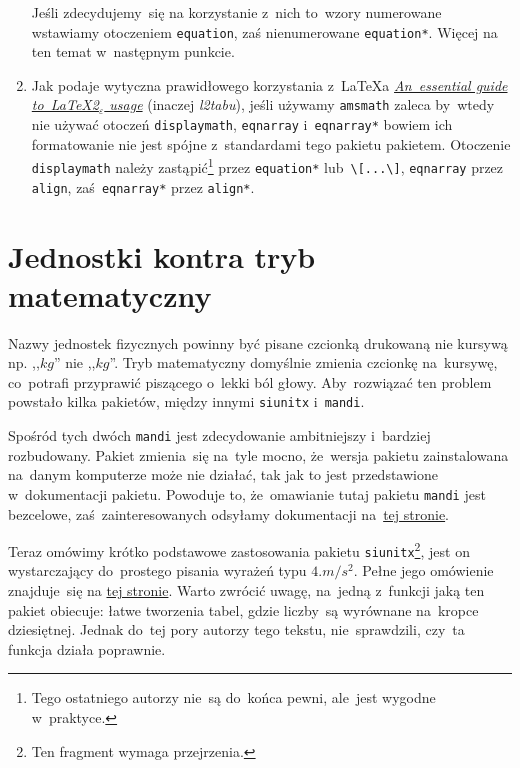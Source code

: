 \documentclass[a4paper,11pt]{article}
\newcommand{\tbs}{\textbackslash}  %
\begin{document}
\begin{enumerate}
  Jeśli zdecydujemy~się na korzystanie z~nich to~wzory numerowane
  wstawiamy otoczeniem \texttt{equation}, zaś nienumerowane
  \texttt{equation*}. Więcej na ten temat w~następnym punkcie.

\item Jak podaje wytyczna prawidłowego korzystania z~\LaTeX a
  \href{ftp://ftp.gust.org.pl/TeX/info/l2tabu/english/l2tabuen.pdf}{\emph{An~essential
      guide to~\LaTeX 2$_{ \varepsilon}$ usage}} (inaczej
  \emph{l2tabu}), jeśli używamy \texttt{amsmath} zaleca by~wtedy nie
  używać otoczeń \texttt{displaymath}, \texttt{eqnarray}
  i~\texttt{eqnarray*} bowiem ich formatowanie nie jest spójne
  z~standardami tego pakietu pakietem. Otoczenie \texttt{displaymath}
  należy zastąpić\footnote{Tego ostatniego autorzy nie~są do~końca
    pewni, ale~jest wygodne w~praktyce.} przez \texttt{equation*}
  lub~\texttt{\tbs [...\tbs ]}, \texttt{eqnarray} przez
  \texttt{align}, zaś~\texttt{eqnarray*} przez \texttt{align*}.

\end{enumerate}





\section{Jednostki kontra tryb matematyczny}
\label{sec:jednostki}

Nazwy jednostek fizycznych powinny być pisane czcionką drukowaną nie
kursywą np. ,,$\si{kg}$'' nie ,,$kg$''. Tryb matematyczny domyślnie
zmienia czcionkę na~kursywę, co~potrafi przyprawić piszącego o~lekki
ból głowy. Aby~rozwiązać ten problem powstało kilka pakietów, między
innymi \texttt{siunitx} i~\texttt{mandi}.

Spośród tych dwóch \texttt{mandi} jest zdecydowanie ambitniejszy
i~bardziej rozbudowany. Pakiet zmienia~się na~tyle mocno, że~wersja
pakietu zainstalowana na~danym komputerze może nie działać, tak jak to
jest przedstawione w~dokumentacji pakietu. Powoduje to, że~omawianie
tutaj pakietu \texttt{mandi} jest bezcelowe, zaś~zainteresowanych
odsyłamy dokumentacji
na~\href{ftp://ftp.gust.org.pl/TeX/macros/latex/contrib/mandi/mandi.pdf}{tej
  stronie}.

Teraz omówimy krótko podstawowe zastosowania pakietu
\texttt{siunitx}\footnote{Ten fragment wymaga przejrzenia.}, jest on
wystarczający do~prostego pisania wyrażeń typu $4\si{.m/s^{ 2 }}$.
Pełne jego omówienie znajduje~się na
\href{ftp://ftp.gust.org.pl/TeX/macros/latex/contrib/siunitx/siunitx.pdf}{tej
  stronie}. Warto zwrócić uwagę, na~jedną z~funkcji jaką ten pakiet
obiecuje: łatwe tworzenia tabel, gdzie liczby~są wyrównane na~kropce
dziesiętnej. Jednak do~tej pory autorzy tego tekstu, nie~sprawdzili,
czy~ta funkcja działa poprawnie.
\end{document}
